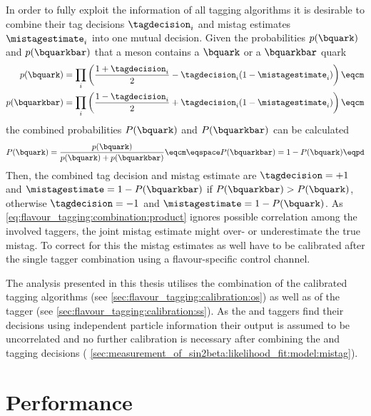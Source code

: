 In order to fully exploit the information of all tagging algorithms it is
desirable to combine their tag decisions $\tagdecision_i$ and mistag estimates
$\mistagestimate_i$ into one mutual decision. Given the probabilities
$p(\bquark)$ and $p(\bquarkbar)$ that a meson contains a $\bquark$ or a
$\bquarkbar$ quark
%
\begin{equation}\label{eq:flavour_tagging:combination:product}
  \begin{split}
    p(\bquark)    &= \prod_i\left( \frac{1 + \tagdecision_i}{2} - \tagdecision_i (1 - \mistagestimate_i) \right)\eqcm\\
    p(\bquarkbar) &= \prod_i\left( \frac{1 - \tagdecision_i}{2} + \tagdecision_i (1 - \mistagestimate_i) \right)\eqcm
  \end{split}
\end{equation}
%
the combined probabilities $P(\bquark)$ and $P(\bquarkbar)$ can be calculated
%
\begin{equation}\label{eq:flavour_tagging:combination:total}
  P(\bquark)    = \frac{p(\bquark)}{p(\bquark) + p(\bquarkbar)}\eqcm\eqspace
  P(\bquarkbar) = 1 - P(\bquark)\eqpd
\end{equation}
%
Then, the combined tag decision and mistag estimate are $\tagdecision = +1$ and
$\mistagestimate = 1 - P(\bquarkbar)$ if $P(\bquarkbar) > P(\bquark)$, otherwise
$\tagdecision = -1$ and $\mistagestimate = 1 - P(\bquark)$. As
\cref{eq:flavour_tagging:combination:product} ignores possible correlation among
the involved taggers, the joint mistag estimate might over- or underestimate the
true mistag. To correct for this the mistag estimates as well have to be
calibrated after the single tagger combination using a flavour-specific control
channel.

The analysis presented in this thesis utilises the combination of the calibrated
\OS tagging algorithms (see \cref{sec:flavour_tagging:calibration:os}) as well
as of the \SSpi tagger (see \cref{sec:flavour_tagging:calibration:ss}). As the
\OS and \SS taggers find their decisions using independent particle information
their output is assumed to be uncorrelated and no further calibration is
necessary after combining the \OS and \SSpi tagging decisions (\cf
\cref{sec:measurement_of_sin2beta:likelihood_fit:model:mistag}).

\section{Performance}
\label{sec:flavour_tagging:performance}

